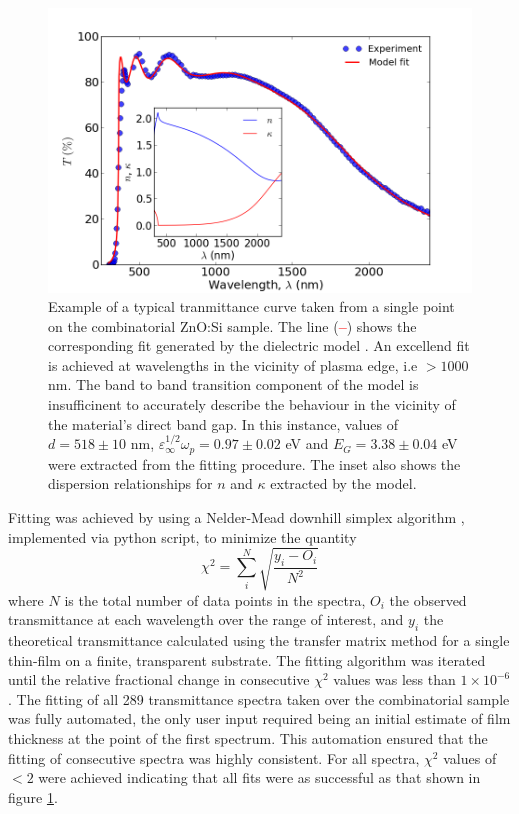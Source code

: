 \documentclass[final,5p,times]{elsarticle}
\begin{document}
\begin{figure}[ht]
\centering
\includegraphics[width = \columnwidth]{figure1.png}
\caption{\label{fig:1} Example of a typical tranmittance curve taken from a single point on the combinatorial ZnO:Si sample. The line (\textcolor{red}{\textbf{--}}) shows the corresponding fit generated by the dielectric model \cite{Treharne2012}. An excellend fit is achieved at wavelengths in the vicinity of plasma edge, i.e $>1000$ nm. The band to band transition component of the model is insufficinent to accurately describe the behaviour in the vicinity of the material's direct band gap. In this instance, values of $d= 518 \pm 10$ nm, $\varepsilon_{\infty}^{1/2}\omega_p = 0.97 \pm 0.02$ eV and $E_{G} = 3.38 \pm 0.04$ eV were extracted from the fitting procedure. The inset also shows the dispersion relationships for $n$ and $\kappa$ extracted by the model.}
\end{figure}

Fitting was achieved by using a Nelder-Mead downhill simplex algorithm \cite{Nelder1965}, implemented via python script, to minimize the quantity
\begin{equation}
\chi^{2} = \sum_{i}^N\sqrt{\frac{y_i - O_i}{N^2}}
\end{equation}\label{eqn:2}
where $N$ is the total number of data points in the spectra, $O_i$ the observed transmittance at each wavelength over the range of interest, and $y_i$ the theoretical transmittance calculated using the transfer matrix method \cite{Macleod1986} for a single thin-film on a finite, transparent substrate.  The fitting algorithm was iterated until the relative fractional change in consecutive $\chi^2$ values was less than $1\times10^{-6}$. The fitting of all 289 transmittance spectra taken over the combinatorial sample was fully automated, the only user input required being an initial estimate of film thickness at the point of the first spectrum. This automation ensured that the fitting of consecutive spectra was highly consistent. For all spectra, $\chi^2$ values of $<2$ were achieved indicating that all fits were as successful as that shown in figure \ref{fig:1}.
\end{document}
